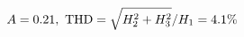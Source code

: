 \documentclass[preview]{standalone}
\begin{document}
\begin{align*}
\special{dvisvgm:raw <g id='unique000'>}A=0.21,\ \text{THD}=\sqrt{H_2^2+H_3^2}/H_1=4.1\%\special{dvisvgm:raw </g>}
\end{align*}
\end{document}
